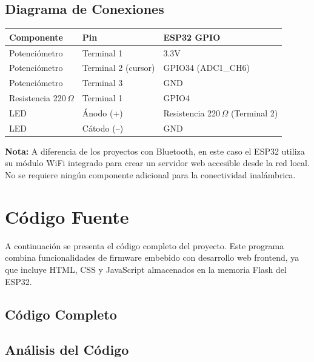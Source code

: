\documentclass[12pt,a4paper]{article}
\begin{document}
\subsection{Diagrama de Conexiones}

\begin{center}
\begin{tabular}{lll}
\toprule
\textbf{Componente} & \textbf{Pin} & \textbf{ESP32 GPIO} \\
\midrule
Potenciómetro & Terminal 1 & 3.3V \\
Potenciómetro & Terminal 2 (cursor) & GPIO34 (ADC1\_CH6) \\
Potenciómetro & Terminal 3 & GND \\
Resistencia 220\,$\Omega$ & Terminal 1 & GPIO4 \\
LED & Ánodo (+) & Resistencia 220\,$\Omega$ (Terminal 2) \\
LED & Cátodo (--) & GND \\
\bottomrule
\end{tabular}
\end{center}

\textbf{Nota:} A diferencia de los proyectos con Bluetooth, en este caso el ESP32 utiliza su módulo WiFi integrado para crear un servidor web accesible desde la red local. No se requiere ningún componente adicional para la conectividad inalámbrica.

\section{Código Fuente}

A continuación se presenta el código completo del proyecto. Este programa combina funcionalidades de firmware embebido con desarrollo web frontend, ya que incluye HTML, CSS y JavaScript almacenados en la memoria Flash del ESP32.

\subsection{Código Completo}


\subsection{Análisis del Código}
\end{document}
